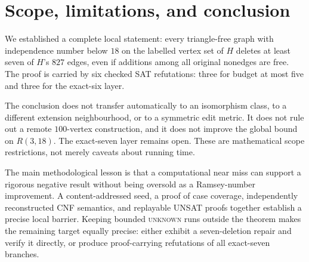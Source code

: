 \section{Scope, limitations, and conclusion}

We established a complete local statement: every triangle-free graph with
independence number below \(18\) on the labelled vertex set of \(H\) deletes at
least seven of \(H\)'s \(827\) edges, even if additions among all original
nonedges are free.  The proof is carried by six checked SAT refutations: three
for budget at most five and three for the exact-six layer.

The conclusion does not transfer automatically to an isomorphism class, to a
different extension neighbourhood, or to a symmetric edit metric.  It does
not rule out a remote \(100\)-vertex construction, and it does not improve the
global bound on \(R(3,18)\).  The exact-seven layer remains open.  These are
mathematical scope restrictions, not merely caveats about running time.

The main methodological lesson is that a computational near miss can support
a rigorous negative result without being oversold as a Ramsey-number
improvement.  A content-addressed seed, a proof of case coverage, independently
reconstructed CNF semantics, and replayable UNSAT proofs together establish a
precise local barrier.  Keeping bounded \textsc{unknown} runs outside the
theorem makes the remaining target equally precise: either exhibit a
seven-deletion repair and verify it directly, or produce proof-carrying
refutations of all exact-seven branches.

